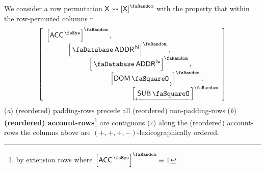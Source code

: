 We consider a row permutation $\col{X}\rightsquigarrow\order{\col{X}}$ with the property that within the row-permuted columns
r
\[
	\left[\begin{array}{l}
		\order{\peekAccount}, \\
		\quad\quad\quad \order{\accAddress\high}, \\
		\quad\quad\quad \quad\quad\quad \order{\accAddress\low}, \\
		\quad\quad\quad \quad\quad\quad \quad\quad\quad \order{\domStamp}, \\
		\quad\quad\quad \quad\quad\quad \quad\quad\quad \quad\quad\quad\order{\subStamp} \\
	\end{array}\right]
\]
(\emph{a}) (reordered) padding-rows precede all (reordered) non-padding-rows
(\emph{b}) \textbf{(reordered) account-rows}\footnote{by extension rows where $\order{\peekAccount} \equiv 1$} are contiguous
(\emph{c}) along the (reordered) account-rows the columns above are $(+, +, +, -)$-lexicographically ordered.
